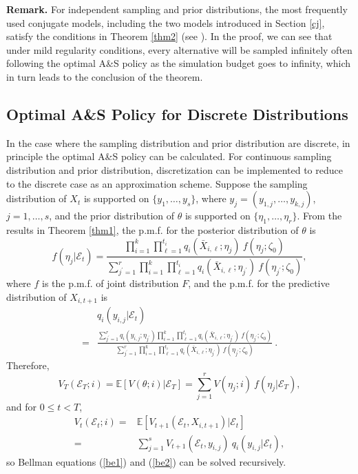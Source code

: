 \documentclass[journal]{IEEEtran}
\begin{document}
     \noindent\textbf{Remark.} 
     For independent sampling and prior distributions, the most frequently used conjugate models, including the two models introduced in Section \ref{cj}, satisfy the conditions in Theorem \ref{thm2}  (see \cite{degroot2005optimal}). In the proof, we can see that under mild regularity conditions, every alternative will be sampled infinitely often following the optimal A\&S policy as the simulation budget goes to infinity, which in turn leads to the conclusion of the theorem. 
 \subsection{Optimal A\&S Policy for Discrete Distributions}\label{odp}
 In the case where the sampling distribution and prior distribution are discrete,  in principle the optimal A\&S policy can be calculated. For continuous sampling distribution and prior distribution, discretization can be implemented to reduce to the discrete case as an approximation scheme. 
 Suppose the sampling distribution of $X_{t}$ is supported on $\{ y_{1},\ldots,y_{s} \}$, where $y_j=(y_{1,j},\ldots,y_{k,j})$, $j=1,\ldots,s$, and the prior distribution of $\theta$ is supported on $\{ \eta_{1},\ldots,\eta_{r} \}$. From the results in Theorem \ref{thm1}, the p.m.f. for the posterior distribution of $\theta$ is
 $$f(\eta_{j}|\mathcal{E}_t)=\frac{ \prod_{i=1}^{k}\prod_{\ell=1}^{t_i} q_i(\bar{X}_{i,\ell};\eta_j)~ f(\eta_{j}; \zeta_0)}{\sum_{j^{'}=1}^{r}\prod_{i=1}^{k}\prod_{\ell=1}^{t_i} q_i(\bar{X}_{i,\ell};\eta_{j^{'}})~f(\eta_{j^{'}}; \zeta_0)},$$
 where $f$ is the p.m.f. of joint distribution $F$, 
 and the p.m.f. for the predictive distribution of $X_{i,t+1}$ is
  \begin{align*}&q_i(y_{i,j}|\mathcal{E}_t)\\
  =&\frac{\sum_{j^{'}=1}^{r}q_i(y_{i,j};\eta_{j^{'}})\prod_{i=1}^{k}\prod_{\ell=1}^{t_i} q_i(\bar{X}_{i,\ell};\eta_{j^{'}})~f(\eta_{j^{'}}; \zeta_0)}{\sum_{j^{'}=1}^{r}\prod_{i=1}^{k}\prod_{\ell=1}^{t_i} q_i(\bar{X}_{i,\ell};\eta_{j^{'}})~f(\eta_{j^{'}}; \zeta_0)}~. \end{align*}
 Therefore, 
   $$V_T(\mathcal{E}_T; i)=\mathbb{E}\left[ V(\theta;i)|\mathcal{E}_T \right]=\sum_{j=1}^{r}V(\eta_j;i) ~f(\eta_{j}|\mathcal{E}_T),$$
   and for $0\leq t<T$,
 \begin{align*}
 V_t(\mathcal{E}_t; i)=&\mathbb{E}\left[ V_{t+1}(\mathcal{E}_{t}, X_{i,t+1}) |\mathcal{E}_{t}\right]\\
 =&\sum_{j=1}^{s}V_{t+1}(\mathcal{E}_{t}, y_{i,j}) ~q_i(y_{i,j}|\mathcal{E}_t) , \end{align*}
 so Bellman equations (\ref{be1}) and (\ref{be2}) can be solved recursively.\\     
 
\end{document}

